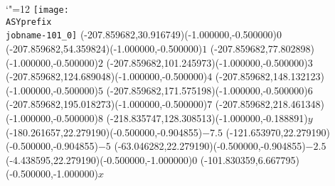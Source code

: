\setlength{\unitlength}{1pt}%
\makeatletter%
\let\ASYencoding\f@encoding%
\let\ASYfamily\f@family%
\let\ASYseries\f@series%
\let\ASYshape\f@shape%
\makeatother%
{\catcode`"=12%
\texttt{[image: \\ASYprefix\\jobname-101\_0]}%
}%
\color{ASYcolor}%
\fontsize{12.000000}{14.400000}\selectfont%
\usefont{\ASYencoding}{\ASYfamily}{\ASYseries}{\ASYshape}%
\ASYalign(-207.859682,30.916749)(-1.000000,-0.500000){\vphantom{$10^4$}$0$}%
\color{ASYcolor}%
\fontsize{12.000000}{14.400000}\selectfont%
\ASYalign(-207.859682,54.359824)(-1.000000,-0.500000){\vphantom{$10^4$}$1$}%
\color{ASYcolor}%
\fontsize{12.000000}{14.400000}\selectfont%
\ASYalign(-207.859682,77.802898)(-1.000000,-0.500000){\vphantom{$10^4$}$2$}%
\color{ASYcolor}%
\fontsize{12.000000}{14.400000}\selectfont%
\ASYalign(-207.859682,101.245973)(-1.000000,-0.500000){\vphantom{$10^4$}$3$}%
\color{ASYcolor}%
\fontsize{12.000000}{14.400000}\selectfont%
\ASYalign(-207.859682,124.689048)(-1.000000,-0.500000){\vphantom{$10^4$}$4$}%
\color{ASYcolor}%
\fontsize{12.000000}{14.400000}\selectfont%
\ASYalign(-207.859682,148.132123)(-1.000000,-0.500000){\vphantom{$10^4$}$5$}%
\color{ASYcolor}%
\fontsize{12.000000}{14.400000}\selectfont%
\ASYalign(-207.859682,171.575198)(-1.000000,-0.500000){\vphantom{$10^4$}$6$}%
\color{ASYcolor}%
\fontsize{12.000000}{14.400000}\selectfont%
\ASYalign(-207.859682,195.018273)(-1.000000,-0.500000){\vphantom{$10^4$}$7$}%
\color{ASYcolor}%
\fontsize{12.000000}{14.400000}\selectfont%
\ASYalign(-207.859682,218.461348)(-1.000000,-0.500000){\vphantom{$10^4$}$8$}%
\color{ASYcolor}%
\fontsize{12.000000}{14.400000}\selectfont%
\ASYalign(-218.835747,128.308513)(-1.000000,-0.188891){$y$}%
\color{ASYcolor}%
\fontsize{12.000000}{14.400000}\selectfont%
\ASYalign(-180.261657,22.279190)(-0.500000,-0.904855){\vphantom{$10^4$}$-7.5$}%
\color{ASYcolor}%
\fontsize{12.000000}{14.400000}\selectfont%
\ASYalign(-121.653970,22.279190)(-0.500000,-0.904855){\vphantom{$10^4$}$-5$}%
\color{ASYcolor}%
\fontsize{12.000000}{14.400000}\selectfont%
\ASYalign(-63.046282,22.279190)(-0.500000,-0.904855){\vphantom{$10^4$}$-2.5$}%
\color{ASYcolor}%
\fontsize{12.000000}{14.400000}\selectfont%
\ASYalign(-4.438595,22.279190)(-0.500000,-1.000000){\vphantom{$10^4$}$0$}%
\color{ASYcolor}%
\fontsize{12.000000}{14.400000}\selectfont%
\ASYalign(-101.830359,6.667795)(-0.500000,-1.000000){$x$}%
